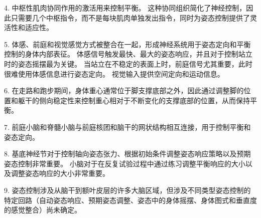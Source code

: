 4. 中枢性肌肉协同作用的激活用来控制平衡。
这种协同组织简化了神经控制，因此只需要几个中枢指令，而不是每块肌肉单独发出指令，同时为姿态控制提供了灵活性和适应性。


5. 体感、前庭和视觉感觉方式被整合在一起，形成神经系统用于姿态定向和平衡控制的身体内部表征。
体感信号触发最快、最大的姿态响应，并且对于控制站立时的姿态摇摆最为关键。
当站立在不稳定的表面上时，前庭信号尤其重要，此时很难使用体感信息进行姿态定向。
视觉输入提供空间定向和运动信息。


6. 在走路和跑步期间，身体重心通常位于脚支撑底部之外，因此通过调整脚的位置和躯干的侧向稳定性来控制重心相对于不断变化的支撑底部的位置，从而保持平衡。


7. 前庭小脑和脊髓小脑与前庭核团和脑干的网状结构相互连接，用于控制平衡和姿态定向。


8. 基底神经节对于控制轴向姿态张力、根据初始条件调整姿态响应策略以及预期姿态控制非常重要。
小脑对于在反复试验过程中通过练习调整平衡响应的大小以及调整姿态响应的大小非常重要。


9. 姿态控制涉及从脑干到额叶皮层的许多大脑区域，但涉及不同类型姿态控制的特定回路（自动姿态响应、预期姿态调整、姿态中的身体摇摆、身体图式和垂直度的感觉整合）尚未确定。

